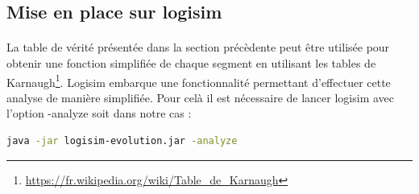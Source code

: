 \subsection{Mise en place sur logisim}
\paragraph{}
La table de vérité présentée dans la section précèdente peut être utilisée pour obtenir une fonction simplifiée de chaque segment en utilisant les tables de Karnaugh\footnote{\url{https://fr.wikipedia.org/wiki/Table_de_Karnaugh}}. Logisim embarque une fonctionnalité permettant d'effectuer cette analyse de manière simplifiée. Pour celà il est nécessaire de lancer logisim avec l'option -analyze soit dans notre cas :

\begin{lstlisting}[language=bash]
java -jar logisim-evolution.jar -analyze
\end{lstlisting}

